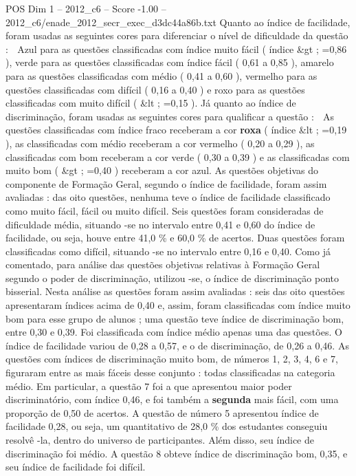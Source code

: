 \begin{textsample}{POS Dim 1 – 2012\_c6 – Score -1.00 – 2012\_c6/enade\_2012\_secr\_exec\_d3dc44a86b.txt}
Quanto ao índice de facilidade, foram usadas as seguintes cores para diferenciar o nível de dificuldade da questão :  Azul para as questões classificadas com índice muito fácil ( índice \&gt ; =0,86 ), verde para as questões classificadas com índice fácil ( 0,61 a 0,85 ), amarelo para as questões classificadas com médio ( 0,41 a 0,60 ), vermelho para as questões classificadas com difícil ( 0,16 a 0,40 ) e roxo para as questões classificadas com muito difícil ( \&lt ; =0,15 ).
Já quanto ao índice de discriminação, foram usadas as seguintes cores para qualificar a questão :  As questões classificadas com índice fraco receberam a cor \textbf{roxa} ( índice \&lt ; =0,19 ), as classificadas com médio receberam a cor vermelho ( 0,20 a 0,29 ), as classificadas com bom receberam a cor verde ( 0,30 a 0,39 ) e as classificadas com muito bom ( \&gt ; =0,40 ) receberam a cor azul.
As questões objetivas do componente de Formação Geral, segundo o índice de facilidade, foram assim avaliadas : das oito questões, nenhuma teve o índice de facilidade classificado como muito fácil, fácil ou muito difícil.
Seis questões foram consideradas de dificuldade média, situando -se no intervalo entre 0,41 e 0,60 do índice de facilidade, ou seja, houve entre 41,0 \% e 60,0 \% de acertos.
Duas questões foram classificadas como difícil, situando -se no intervalo entre 0,16 e 0,40.
Como já comentado, para análise das questões objetivas relativas à Formação Geral segundo o poder de discriminação, utilizou -se, o índice de discriminação ponto bisserial.
Nesta análise as questões foram assim avaliadas : seis das oito questões apresentaram índices acima de 0,40 e, assim, foram classificadas com índice muito bom para esse grupo de alunos ; uma questão teve índice de discriminação bom, entre 0,30 e 0,39.
Foi classificada com índice médio apenas uma das questões.
O índice de facilidade variou de 0,28 a 0,57, e o de discriminação, de 0,26 a 0,46.
As questões com índices de discriminação muito bom, de números 1, 2, 3, 4, 6 e 7, figuraram entre as mais fáceis desse conjunto : todas classificadas na categoria médio.
Em particular, a questão 7 foi a que apresentou maior poder discriminatório, com índice 0,46, e foi também a \textbf{segunda} mais fácil, com uma proporção de 0,50 de acertos.
A questão de número 5 apresentou índice de facilidade 0,28, ou seja, um quantitativo de 28,0 \% dos estudantes conseguiu resolvê -la, dentro do universo de participantes.
Além disso, seu índice de discriminação foi médio.
A questão 8 obteve índice de discriminação bom, 0,35, e seu índice de facilidade foi difícil.

\end{textsample}
